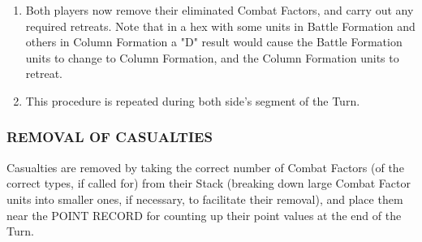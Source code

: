 \begin{enumerate}
  \item Both players now remove their eliminated Combat Factors, and carry out any required retreats. Note that in a hex with some units in Battle Formation and others in Column Formation a "D" result would cause the Battle Formation units to change to Column Formation, and the Column Formation units to retreat.

  \item This procedure is repeated during both side's segment of the Turn.
\end{enumerate}

\subsubsection{REMOVAL OF CASUALTIES}

Casualties are removed by taking the correct number of Combat Factors (of the correct types, if called for) from their Stack (breaking down large Combat Factor units into smaller ones, if necessary, to facilitate their removal), and place them near the POINT RECORD for counting up their point values at the end of the Turn.
